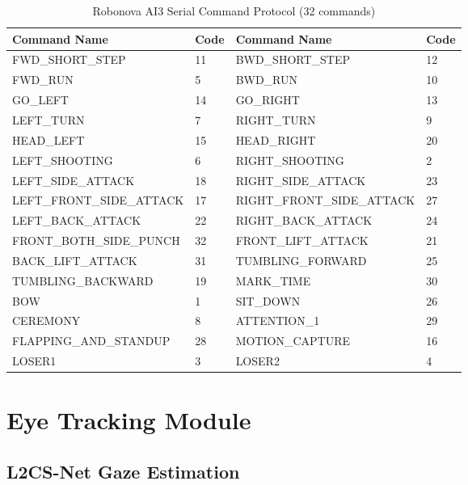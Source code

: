 \documentclass[12pt, a4paper, oneside]{report}
\begin{document}
\begin{description}
\begin{table}[h]
\centering
\caption{Robonova AI3 Serial Command Protocol (32 commands)}
\label{tab:robot_commands}
\begin{tabular}{llll}
\toprule
\textbf{Command Name} & \textbf{Code} & \textbf{Command Name} & \textbf{Code} \\
\midrule
FWD\_SHORT\_STEP        & 11 & BWD\_SHORT\_STEP       & 12 \\
FWD\_RUN               &  5 & BWD\_RUN              & 10 \\
GO\_LEFT               & 14 & GO\_RIGHT             & 13 \\
LEFT\_TURN             &  7 & RIGHT\_TURN           &  9 \\
HEAD\_LEFT             & 15 & HEAD\_RIGHT           & 20 \\
LEFT\_SHOOTING         &  6 & RIGHT\_SHOOTING       &  2 \\
LEFT\_SIDE\_ATTACK      & 18 & RIGHT\_SIDE\_ATTACK    & 23 \\
LEFT\_FRONT\_SIDE\_ATTACK & 17 & RIGHT\_FRONT\_SIDE\_ATTACK & 27 \\
LEFT\_BACK\_ATTACK      & 22 & RIGHT\_BACK\_ATTACK    & 24 \\
FRONT\_BOTH\_SIDE\_PUNCH & 32 & FRONT\_LIFT\_ATTACK    & 21 \\
BACK\_LIFT\_ATTACK      & 31 & TUMBLING\_FORWARD     & 25 \\
TUMBLING\_BACKWARD     & 19 & MARK\_TIME            & 30 \\
BOW                    &  1 & SIT\_DOWN             & 26 \\
CEREMONY               &  8 & ATTENTION\_1          & 29 \\
FLAPPING\_AND\_STANDUP  & 28 & MOTION\_CAPTURE       & 16 \\
LOSER1                 &  3 & LOSER2                &  4 \\
\bottomrule
\end{tabular}
\end{table}

\section{Eye Tracking Module}
\label{sec:eyetracking}

\subsection{L2CS-Net Gaze Estimation}


\end{description}
\end{document}
